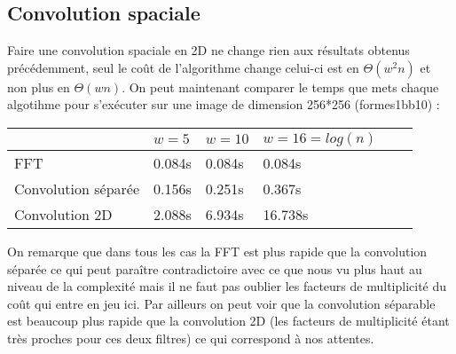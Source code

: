 \documentclass[12pt]{article}
\numberwithin{equation}{section}
\begin{document}
\subsection{Convolution spaciale}
Faire une convolution spaciale en 2D ne change rien aux résultats obtenus précédemment, seul le coût de l'algorithme change celui-ci est en $\Theta(w^2n)$ et non plus en $\Theta(wn)$. On peut maintenant comparer le temps que mets chaque algotihme pour s'exécuter sur une image de dimension 256*256 (formes1bb10) :
\begin{center}
  \begin{tabular}{|l|l|l|l|l|l|}
    \hline
    & $w = 5$ & $w = 10$ & $w = 16 = log(n)$ \\
    \hline
    FFT & 0.084s & 0.084s & 0.084s\\
    \hline
    Convolution séparée &  0.156s &  0.251s & 0.367s\\
    \hline
    Convolution 2D & 2.088s & 6.934s & 16.738s \\
    \hline
  \end{tabular}
\end{center}

On remarque que dans tous les cas la FFT est plus rapide que la convolution séparée ce qui peut paraître contradictoire avec ce que nous vu plus haut au niveau de la complexité mais il ne faut pas oublier les facteurs de multiplicité du coût qui entre en jeu ici. Par ailleurs on peut voir que la convolution séparable est beaucoup plus rapide que la convolution 2D (les facteurs de multiplicité étant très proches pour ces deux filtres) ce qui correspond à nos attentes.
\end{document}
